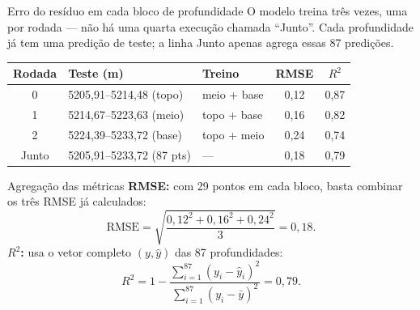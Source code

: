 \documentclass[aspectratio=169,10pt]{beamer}
\begin{document}
\begin{frame}{Erro do resíduo em cada bloco de profundidade}
  \footnotesize
  O modelo treina três vezes, uma por rodada --- não há uma quarta
  execução chamada ``Junto''. Cada profundidade já tem uma predição
  de teste; a linha Junto apenas agrega essas 87 predições.
  \vspace{0.10cm}
  \centering
  \scriptsize
  \setlength{\tabcolsep}{3.6pt}
  \begin{tabular}{cllcc}
    \toprule
    Rodada & Teste (m) & Treino & RMSE & $R^2$ \\
    \midrule
    0 & 5205,91--5214,48 (topo) & meio + base & 0,12 & 0,87 \\
    1 & 5214,67--5223,63 (meio) & topo + base & 0,16 & 0,82 \\
    2 & 5224,39--5233,72 (base) & topo + meio & 0,24 & 0,74 \\
    \midrule
    Junto & 5205,91--5233,72 (87 pts) & --- & 0,18 & 0,79 \\
    \bottomrule
  \end{tabular}
  \par
  \vspace{0.12cm}
  \begin{minipage}{0.94\textwidth}
    \begin{exampleblock}{Agregação das métricas}
      \scriptsize
      \textbf{RMSE:} com 29 pontos em cada bloco, basta combinar os três
      RMSE já calculados:
      \[
        \mathrm{RMSE}
        = \sqrt{\frac{0{,}12^{2}+0{,}16^{2}+0{,}24^{2}}{3}}
        = 0{,}18.
      \]
      \textbf{$R^2$:} usa o vetor completo $(y,\hat{y})$ das 87 profundidades:
      \[
        R^{2}
        = 1 - \frac{\sum_{i=1}^{87}(y_i-\hat{y}_i)^{2}}
                  {\sum_{i=1}^{87}(y_i-\bar{y})^{2}}
        = 0{,}79.
      \]
    \end{exampleblock}
  \end{minipage}
\end{frame}
\end{document}
